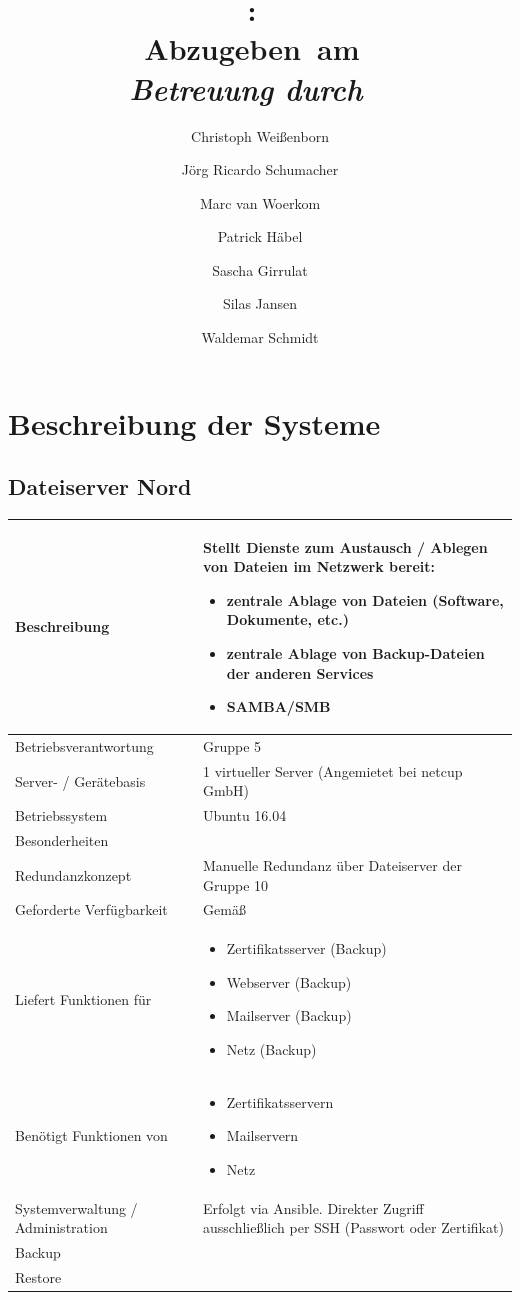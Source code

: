 \documentclass[]{article}
\title{
\vspace{0.2in} %
\textmd{\textbf{\Class:\ \Title}}\\
\normalsize\vspace{0.1in}\small{Abzugeben\ am\ \DueDate}\\
\vspace{0.1in}\large{\textit{Betreuung durch \ClassInstructor\ \ClassTime}}
\vspace{3in} %
}
\author[1]{Christoph Weißenborn}
\author[1]{Jörg Ricardo Schumacher}
\author[1]{Marc van Woerkom}
\author[1]{Patrick Häbel}
\author[2]{Sascha Girrulat}
\author[2]{Silas Jansen}
\author[1]{Waldemar Schmidt}
\affil[1]{Gruppe 5 (Nord)}
\affil[2]{Gruppe 10 (Süd)}
\date{} %
\begin{document}
\maketitle



\newpage
\tableofcontents
\newpage
\section{Beschreibung der Systeme}\label{beschreibung-der-systeme}

\subsection{Dateiserver Nord}\label{dateiserver-nord}

\begin{longtable}{l|p{8cm}}
\toprule
Beschreibung & Stellt Dienste zum Austausch / Ablegen von Dateien im
Netzwerk bereit:

\begin{itemize}
\item
  zentrale Ablage von Dateien (Software, Dokumente, etc.)
\item
  zentrale Ablage von Backup-Dateien der anderen Services
\item
  SAMBA/SMB
\end{itemize}\tabularnewline
\midrule
Betriebsverantwortung & Gruppe 5\tabularnewline
Server- / Gerätebasis & 1 virtueller Server (Angemietet bei netcup
GmbH)\tabularnewline
Betriebssystem & Ubuntu 16.04\tabularnewline
Besonderheiten &\tabularnewline
Redundanzkonzept & Manuelle Redundanz über Dateiserver der Gruppe
10\tabularnewline
Geforderte Verfügbarkeit & Gemäß\tabularnewline
Liefert Funktionen für & \begin{itemize}
\item
  Zertifikatsserver (Backup)
\item
  Webserver (Backup)
\item
  Mailserver (Backup)
\item
  Netz (Backup)
\end{itemize}\tabularnewline
Benötigt Funktionen von & \begin{itemize}
\item
  Zertifikatsservern
\item
  Mailservern
\item
  Netz
\end{itemize}\tabularnewline
Systemverwaltung / Administration & Erfolgt via Ansible. Direkter Zugriff ausschließlich per SSH (Passwort oder Zertifikat)\tabularnewline
Backup &\tabularnewline
Restore &\tabularnewline
\bottomrule
\end{longtable}
\end{document}
